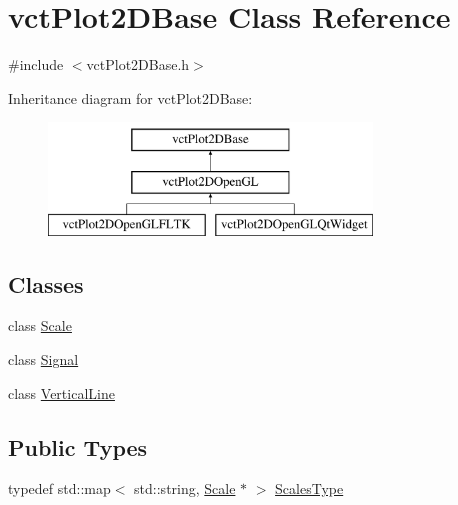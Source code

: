 \hypertarget{classvct_plot2_d_base}{}\section{vct\+Plot2\+D\+Base Class Reference}
\label{classvct_plot2_d_base}


{\ttfamily \#include $<$vct\+Plot2\+D\+Base.\+h$>$}

Inheritance diagram for vct\+Plot2\+D\+Base\+:\begin{figure}[H]
\begin{center}
\leavevmode
\includegraphics[height=3.000000cm]{d8/d91/classvct_plot2_d_base}
\end{center}
\end{figure}
\subsection*{Classes}
\begin{DoxyCompactItemize}
\item 
class \hyperlink{classvct_plot2_d_base_1_1_scale}{Scale}
\item 
class \hyperlink{classvct_plot2_d_base_1_1_signal}{Signal}
\item 
class \hyperlink{classvct_plot2_d_base_1_1_vertical_line}{Vertical\+Line}
\end{DoxyCompactItemize}
\subsection*{Public Types}
\begin{DoxyCompactItemize}
\item 
typedef std\+::map$<$ std\+::string, \hyperlink{classvct_plot2_d_base_1_1_scale}{Scale} $\ast$ $>$ \hyperlink{classvct_plot2_d_base_a0f7274ebd354a06e7102b164f60b7d94}{Scales\+Type}
\end{DoxyCompactItemize}
